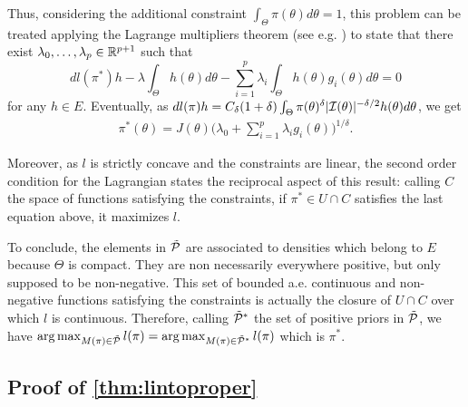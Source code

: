 Thus, considering the additional constraint $\int_\Theta\pi(\theta)d\theta=1$, this problem can be treated applying the Lagrange multipliers theorem (see e.g. \citep{zeidler_applied_2012}) to state that there exist $\lambda_0,\dots,\lambda_p\in\mathbb{R}^{p+1}$ such that
    \begin{equation}
        dl(\pi^\ast)h - \lambda\int_\Theta h(\theta)d\theta - \sum_{i=1}^p\lambda_i\int_\Theta h(\theta)g_i(\theta)d\theta = 0
    \end{equation}
for any $h\in E$. Eventually, as $dl(\pi)h=C_\delta(1+\delta)\int_\Theta\pi(\theta)^{\delta}|\mathcal{I}(\theta)|^{-\delta/2}h(\theta)d\theta$, we get
    \begin{align}
        \pi^\ast(\theta) = J(\theta)\bigg(\lambda_0+\sum_{i=1}^p\lambda_ig_i(\theta)\bigg)^{1/\delta}.
    \end{align}

Moreover,
as $l$ is strictly concave and the constraints are linear, the second order condition for the Lagrangian states the reciprocal aspect of this result: calling $C$ the space of functions satisfying the constraints, if $\pi^\ast\in U\cap C$ satisfies the last equation above, it maximizes $l$.



To conclude, the elements in $\tilde{\mathcal{P}}$ are associated to densities which belong to $E$ because $\Theta$ is compact.
They are non necessarily everywhere positive, but only supposed to be non-negative.
This set of bounded a.e. continuous and non-negative functions satisfying the constraints is actually the closure of $U\cap C$ over which $l$ is continuous.
Therefore, calling $\tilde{\mathcal{P}}^\ast$ the set of positive priors in $\tilde{\mathcal{P}}$, we have $\operatorname*{arg\,max}_{M(\pi)\in\tilde{\mathcal{P}}}l(\pi)=\operatorname*{arg\,max}_{M(\pi)\in\tilde{\mathcal{P}}^\ast}l(\pi)$ which is $\pi^\ast$.








\subsection{Proof of \cref{thm:lintoproper}}


